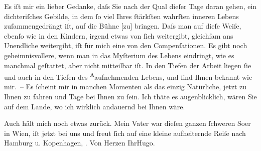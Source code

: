 \pstart
           Es iſt mir ein lieber Gedanke, daſs Sie nach der Qual dieſer Tage daran {\pb}gehen, ein dichteriſches Gebilde, in dem ſo viel Ihres
               ſtärkſten wahrſten inneren Lebens zuſammengedrängt iſt, auf die Bühne
                  {[}zu{]} bringen. Daſs man auf dieſe Weiſe, ebenſo wie in den Kindern,
               irgend etwas von ſich weitergibt, gleichſam ans Unendliche weitergibt, iſt für mich
               eine von den Compenſationen. Es gibt noch geheimnisvollere, wenn man in das Myſterium
               des Lebens eindringt, wie es manchmal geſtattet, aber {\pb}nicht mitteilbar iſt. In den
               Tiefen der Arbeit liegen ſie und auch in den Tiefen des \substVorne{}\textsuperscript{A}\substDazwischen{}a\substHinten{}ufnehmenden Lebens, und ſind Ihnen bekannt wie mir. – Es ſcheint mir in
               manchen Momenten als das einzig Natürliche, jetzt zu Ihnen zu fahren und Tage bei
               Ihnen zu ſein. Ich thäte es augenblicklich, wären Sie auf dem Lande, wo ich wirklich
               andauernd bei Ihnen wäre.\pend
           
\pstart
           Auch hält mich noch etwas zurück. Mein Vater war dieſen ganzen ſchweren So{\geminationm}er in Wien, iſt jetzt bei uns und freut ſich auf eine kleine aufheiternde Reiſe nach
                  Hamburg u. Kopenhagen, \label{T_L02027-1v}\label{T_L02027-1}{ }\label{T_L02027-2v}\label{T_L02027-2}.\pend
           \pstart Von Herzen Ihr\spacefill\mbox{Hugo.}\pend{}\endnumbering{}  
      